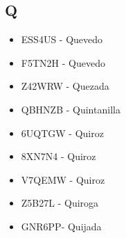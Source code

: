 \subsection*{Q}
\begin{itemize}[leftmargin=*,nosep]
\item ESS4US - Quevedo
\item F5TN2H - Quevedo
\item Z42WRW  -  Quezada
\item QBHNZB - Quintanilla
\item 6UQTGW  -  Quiroz
\item 8XN7N4 -  Quiroz
\item V7QEMW - Quiroz
\item Z5B27L - Quiroga
\item GNR6PP- Quijada
\end{itemize}

